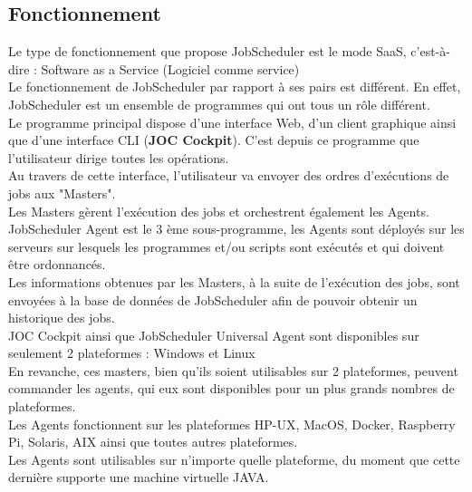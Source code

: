 \documentclass[12pt]{article}
\begin{document}
\subsection{Fonctionnement}
Le type de fonctionnement que propose JobScheduler est le mode SaaS, c'est-à-dire : Software as a Service (Logiciel comme service)
\\
Le fonctionnement de JobScheduler par rapport à ses pairs est différent. En effet, JobScheduler est un ensemble de programmes qui ont tous un rôle différent.
\\
Le programme principal dispose d'une interface Web, d'un client graphique ainsi que d'une interface CLI (\textbf{JOC Cockpit}). C'est depuis ce programme que l'utilisateur dirige toutes les opérations.
\\
Au travers de cette interface, l'utilisateur va envoyer des ordres d'exécutions de jobs aux "Masters".
\\
Les Masters gèrent l'exécution des jobs et orchestrent également les Agents.
\\
JobScheduler Agent est le 3 ème sous-programme, les Agents sont déployés sur les serveurs sur lesquels les programmes et/ou scripts sont exécutés et qui doivent être ordonnancés.
\\
Les informations obtenues par les Masters, à la suite de l'exécution des jobs, sont envoyées à la base de données de JobScheduler afin de pouvoir obtenir un historique des jobs.
\\
JOC Cockpit ainsi que JobScheduler Universal Agent sont disponibles sur seulement 2 plateformes : Windows et Linux
\\
En revanche, ces masters, bien qu'ils soient utilisables sur 2 plateformes, peuvent commander les agents, qui eux sont disponibles pour un plus grands nombres de plateformes.
\\
Les Agents fonctionnent sur les plateformes HP-UX, MacOS, Docker, Raspberry Pi, Solaris, AIX ainsi que toutes autres plateformes.
\\
Les Agents sont utilisables sur n'importe quelle plateforme, du moment que cette dernière supporte une machine virtuelle JAVA.
\end{document}
